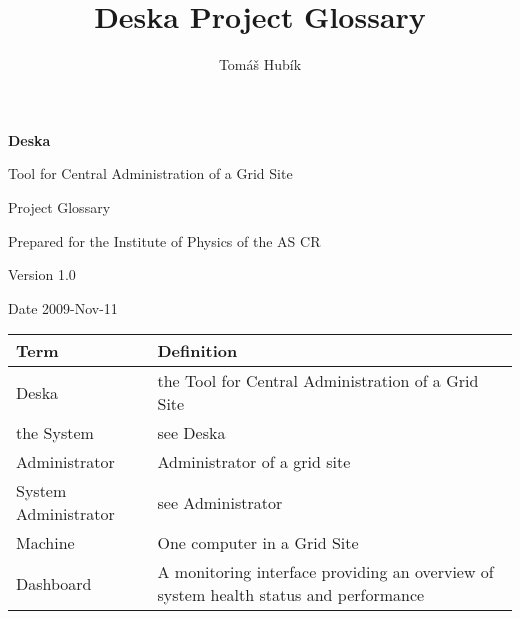 \documentclass[12pt]{article}
\author{Tomáš Hubík}
\title{Deska Project Glossary}
\begin{document}
{\Huge \textbf{Deska}}

\vspace{0.2in}

{\large Tool for Central Administration of a Grid Site}

\vspace{0.5in}

{\large Project Glossary}

\vspace{0.2in}

{\large Prepared for the Institute of Physics of the AS CR}

\vspace{0.2in}

{\large Version 1.0}

\vspace{0.2in}

{\large Date 2009-Nov-11}

\vspace{0.5in}


\begin{center}
	\begin{tabular}{| p{5cm} | p{10cm} |}
		\hline
		\textbf{Term} & \textbf{Definition}\\
		\hline
	Deska		& the Tool for Central Administration of a Grid Site\\
	the System	& see Deska\\
	Administrator	& Administrator of a grid site\\
	System Administrator & see Administrator\\
	Machine		& One computer in a Grid Site\\
	Dashboard	& A monitoring interface providing an overview of system health status and performance\\
		\hline
	\end{tabular}
	\label{tab:ProjectGlossary}
\end{center}
\end{document}
